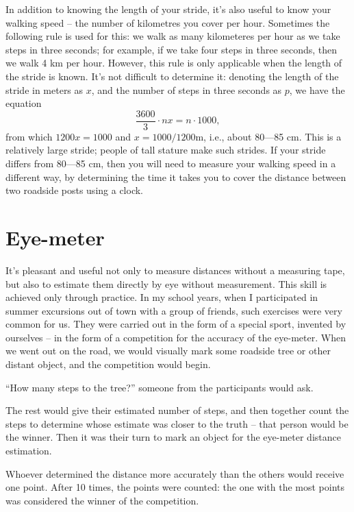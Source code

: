 In addition to knowing the length of your stride, it's also useful to know your walking speed -- the number of kilometres you cover per hour. Sometimes the following rule is used for this: we walk as many kilometeres per hour as we take steps in three seconds; for example, if we take four steps in three seconds, then we walk 4 km per hour. However, this rule is only applicable when the length of the stride is known. It's not difficult to determine it: denoting the length of the stride in meters as $x$, and the number of steps in three seconds as $p$, we have the equation
\begin{equation*}%
\frac{3600}{3} \cdot nx = n \cdot 1000, 
\end{equation*}
from which $1200x = 1000$ and $x = 1000/1200 \si{\meter}$, i.e., about 80—85 cm. This is a relatively large stride; people of tall stature make such strides. If your stride differs from 80—85 cm, then you will need to measure your walking speed in a different way, by determining the time it takes you to cover the distance between two roadside posts using a clock.

\section{Eye-meter}
\label{sec-4.2}

It's pleasant and useful not only to measure distances without a measuring tape, but also to estimate them directly by eye without measurement. This skill is achieved only through practice. In my school years, when I participated in summer excursions out of town with a group of friends, such exercises were very common for us. They were carried out in the form of a special sport, invented by ourselves -- in the form of a competition for the accuracy of the eye-meter. When we went out on the road, we would visually mark some roadside tree or other distant object, and the competition would begin.

``How many steps to the tree?'' someone from the participants would ask.

The rest would give their estimated number of steps, and then together count the steps to determine whose estimate was closer to the truth -- that person would be the winner. Then it was their turn to mark an object for the eye-meter distance estimation.

Whoever determined the distance more accurately than the others would receive one point. After 10 times, the points were counted: the one with the most points was considered the winner of the competition.


